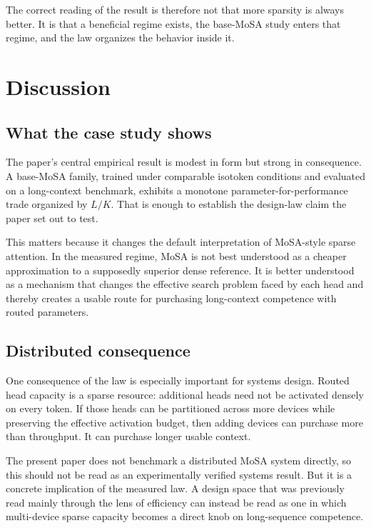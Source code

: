 \documentclass[11pt]{article}
\begin{document}
The correct reading of the result is therefore not that more sparsity is always better. It is that a beneficial regime exists, the base-MoSA study enters that regime, and the law organizes the behavior inside it.

\section{Discussion}
\label{sec:discussion}

\subsection{What the case study shows}

The paper's central empirical result is modest in form but strong in consequence. A base-MoSA family, trained under comparable isotoken conditions and evaluated on a long-context benchmark, exhibits a monotone parameter-for-performance trade organized by $L/K$. That is enough to establish the design-law claim the paper set out to test.

This matters because it changes the default interpretation of MoSA-style sparse attention. In the measured regime, MoSA is not best understood as a cheaper approximation to a supposedly superior dense reference. It is better understood as a mechanism that changes the effective search problem faced by each head and thereby creates a usable route for purchasing long-context competence with routed parameters.

\subsection{Distributed consequence}

One consequence of the law is especially important for systems design. Routed head capacity is a sparse resource: additional heads need not be activated densely on every token. If those heads can be partitioned across more devices while preserving the effective activation budget, then adding devices can purchase more than throughput. It can purchase longer usable context.

The present paper does not benchmark a distributed MoSA system directly, so this should not be read as an experimentally verified systems result. But it is a concrete implication of the measured law. A design space that was previously read mainly through the lens of efficiency can instead be read as one in which multi-device sparse capacity becomes a direct knob on long-sequence competence.
\end{document}
